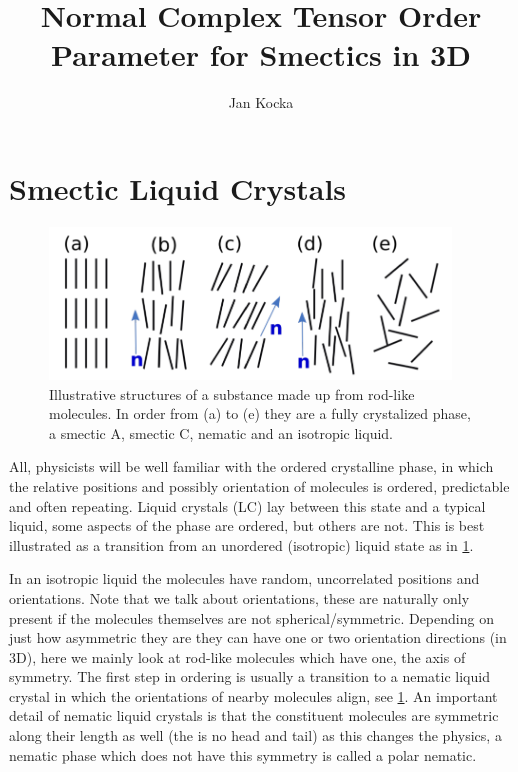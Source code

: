 \documentclass[12pt]{article}
\begin{document}
\title{Normal Complex Tensor Order Parameter for Smectics in 3D}
\author{Jan Kocka}

\begin{abstract}
    \lipsum[10]
\end{abstract}

\maketitle

\personalstatement
\acknowledgments

\maintext

\section{Smectic Liquid Crystals}
\begin{figure}[t]
    \begin{center}
        \includegraphics[width=0.95\textwidth]{figures/phases.pdf}
    \end{center}
    \caption{
        Illustrative structures of a substance made up from rod-like molecules.
        In order from (a) to (e) they are a fully crystalized phase, a smectic A, smectic C, nematic and an isotropic liquid.
    }\label{fig:phases}
\end{figure}
All, physicists will be well familiar with the ordered crystalline phase, in which the relative positions and possibly orientation of molecules is ordered, predictable and often repeating.
Liquid crystals (LC) lay between this state and a typical liquid, some aspects of the phase are ordered, but others are not.
This is best illustrated as a transition from an unordered (isotropic) liquid state as in \cref{fig:phases}.

In an isotropic liquid the molecules have random, uncorrelated positions and orientations.
Note that we talk about orientations, these are naturally only present if the molecules themselves are not spherical/symmetric.
Depending on just how asymmetric they are they can have one or two orientation directions (in 3D), here we mainly look at rod-like molecules which have one, the axis of symmetry.
The first step in ordering is usually a transition to a nematic liquid crystal in which the orientations of nearby molecules align, see \cref{fig:phases}.
An important detail of nematic liquid crystals is that the constituent molecules are symmetric along their length as well (the is no head and tail) as this changes the physics, a nematic phase which does not have this symmetry is called a polar nematic.
\end{document}
